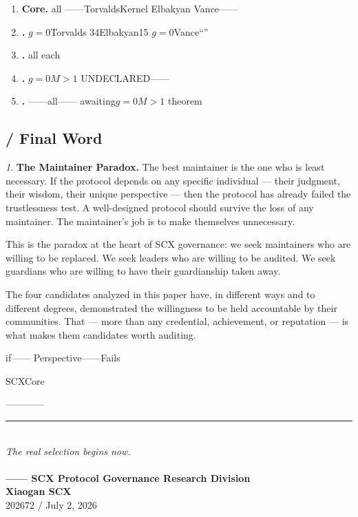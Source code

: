 \documentclass[12pt,a4paper]{article}
\theoremstyle{remark}
\newtheorem{govinsight}{}[section]
\newenvironment{govbox}{%
  \begin{center}
  \color{insightblue}
  \begin{minipage}{0.92\textwidth}
  \begin{govinsight}
}{%
  \end{govinsight}
  \end{minipage}
  \end{center}
}
\begin{document}
\begin{enumerate}[leftmargin=*]

    \item \textbf{Core.} all
          ——TorvaldsKernel
          Elbakyan
          Vance——

    \item \textbf{.} 
          $g=0$Torvalds
          34Elbakyan15
          $g=0$Vance“”

    \item \textbf{.} all
          each
          

    \item \textbf{.} 
          $g=0$$M>1$
          UNDECLARED——
          

    \item \textbf{.} ——all——
          awaiting$g=0$$M>1$
          theorem

\end{enumerate}

\subsection{ / Final Word}

\begin{govbox}
\textbf{The Maintainer Paradox.}
The best maintainer is the one who is least necessary. If the protocol
depends on any specific individual — their judgment, their wisdom, their
unique perspective — then the protocol has already failed the trustlessness
test. A well-designed protocol should survive the loss of any maintainer.
The maintainer's job is to make themselves unnecessary.

This is the paradox at the heart of SCX governance: we seek maintainers who
are willing to be replaced. We seek leaders who are willing to be audited.
We seek guardians who are willing to have their guardianship taken away.

The four candidates analyzed in this paper have, in different ways and to
different degrees, demonstrated the willingness to be held accountable by
their communities. That — more than any credential, achievement, or
reputation — is what makes them candidates worth auditing.

\textbf{}
if——
Perspective——Fails


SCXCore



————
\end{govbox}

\begin{center}
\rule{0.5\textwidth}{0.5pt}\\[8pt]
\textit{The real selection begins now.}\\[4pt]
\textit{}\\[8pt]
\textbf{—— SCX Protocol Governance Research Division}\\[4pt]
\textbf{Xiaogan SCX}\\[4pt]
202672 / July 2, 2026
\end{center}
\end{document}
